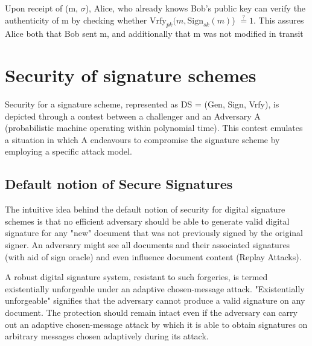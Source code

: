 \documentclass[]{final_report}
\theoremstyle{definition}
\begin{document}
Upon receipt of (m, $\sigma$), Alice, who already knows Bob's public key can verify the authenticity of m by checking whether $\text{Vrfy}_{pk} (m, \text{Sign}_{sk}(m)$) $\stackrel{?}{=} 1$. This assures Alice both that Bob sent m, and additionally that m was not modified in transit

\section{Security of signature schemes}
Security for a signature scheme, represented as DS = (Gen, Sign, Vrfy), is depicted through a contest between a challenger and an Adversary A (probabilistic machine operating within polynomial time). This contest emulates a situation in which A endeavours to compromise the signature scheme by employing a specific attack model. 

\subsection{Default notion of Secure Signatures}
The intuitive idea behind the default notion of security for digital signature schemes is that no efficient adversary should be able to generate valid digital signature for any "new" document that was not previously signed by the original signer.
An adversary might see all documents and their associated signatures (with aid of sign oracle) and even influence document content (Replay Attacks).

A robust digital signature system, resistant to such forgeries, is termed existentially unforgeable under an adaptive chosen-message attack. "Existentially unforgeable" signifies that the adversary cannot produce a valid signature on any document. The protection should remain intact even if the adversary can carry out an adaptive chosen-message attack by which it is able to obtain signatures on arbitrary messages chosen adaptively during its attack.
\end{document}
